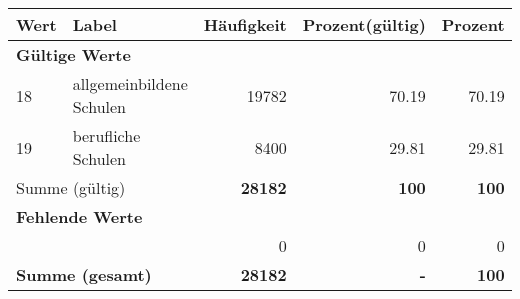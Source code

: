      \begin{longtable}{lXrrr}
     \toprule
     \textbf{Wert} & \textbf{Label} & \textbf{Häufigkeit} & \textbf{Prozent(gültig)} & \textbf{Prozent} \\
     \endhead
     \midrule
     \multicolumn{5}{l}{\textbf{Gültige Werte}}\\

     18 &
     \multicolumn{1}{X}{ allgemeinbildene Schulen   } &


       \num{19782} &
       \num[round-mode=places,round-precision=2]{70.19} &
         \num[round-mode=places,round-precision=2]{70.19} \\

     19 &
     \multicolumn{1}{X}{ berufliche Schulen   } &


       \num{8400} &
       \num[round-mode=places,round-precision=2]{29.81} &
         \num[round-mode=places,round-precision=2]{29.81} \\
     \midrule
     \multicolumn{2}{l}{Summe (gültig)} &
       \textbf{\num{28182}} &
     \textbf{100} &
       \textbf{\num[round-mode=places,round-precision=2]{100}} \\
     \multicolumn{5}{l}{\textbf{Fehlende Werte}}\\
      & & 0 & 0 & 0 \\
     \midrule
     \multicolumn{2}{l}{\textbf{Summe (gesamt)}} &
          \textbf{\num{28182}} &
        \textbf{-} &
        \textbf{100} \\
     \bottomrule
     \end{longtable}
     

